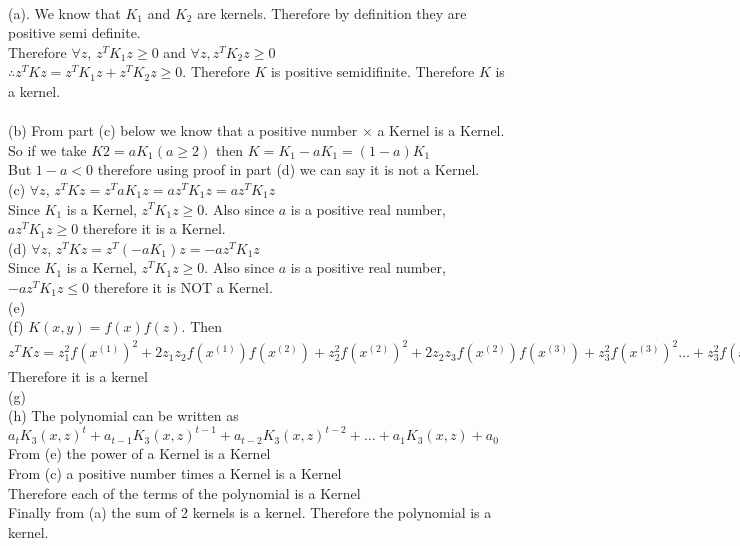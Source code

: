 \begin{answer}\\
(a). We know that $K_1$ and $K_2$ are kernels. Therefore by definition they are positive semi definite.\\
Therefore $\forall z$, $z^TK_1z \geq 0$ and $\forall z, z^TK_2z \geq 0$\\
$\therefore z^TKz = z^TK_1z+z^TK_2z \geq 0$. Therefore $K$ is positive semidifinite. Therefore $K$ is a kernel.\\
\\
(b) From part (c) below we know that a positive number $\times$ a Kernel is a Kernel. So if we take $K2=aK_1 (a \geq 2)$ then $K=K_1-aK_1=(1-a)K_1$\\
But $1-a <0$ therefore using proof in part (d) we can say it is not a Kernel.\\
(c) $\forall z$, $z^TKz=z^TaK_1z=az^TK_1z=az^TK_1z$\\
Since $K_1$ is a Kernel, $z^TK_1z \geq 0$. Also since $a$ is a positive real number, $az^TK_1z \geq 0$ therefore it is a Kernel.\\
(d) $\forall z$, $z^TKz=z^T(-aK_1)z=-az^TK_1z$\\
Since $K_1$ is a Kernel, $z^TK_1z \geq 0$. Also since $a$ is a positive real number, $-az^TK_1z \leq 0$ therefore it is NOT a Kernel.\\
(e) \\
(f) $K(x,y)=f(x)f(z)$. Then $z^TKz=z_1^2f(x^{(1)})^2+2z_1z_2f(x^{(1)})f(x^{(2)})+z_2^2f(x^{(2)})^2+2z_2z_3f(x^{(2)})f(x^{(3)})+z_3^2f(x^{(3)})^2 \dots +z_3^2f(x^{(3)})^2=(\sum_{i=1}^{m}u_i f(x^{(i)}))^2 \geq 0$\\
Therefore it is a kernel\\
(g) \\
(h) The polynomial can be written as $a_tK_3(x,z)^t+a_{t-1}K_3(x,z)^{t-1}+a_{t-2}K_3(x,z)^{t-2}+\dots+a_1K_3(x,z)+a_0$\\
From (e) the power of a Kernel is a Kernel\\
From (c) a positive number times a Kernel is a Kernel\\
Therefore each of the terms of the polynomial is a Kernel\\
Finally from (a) the sum of 2 kernels is a kernel. Therefore the polynomial is a kernel.
\end{answer}